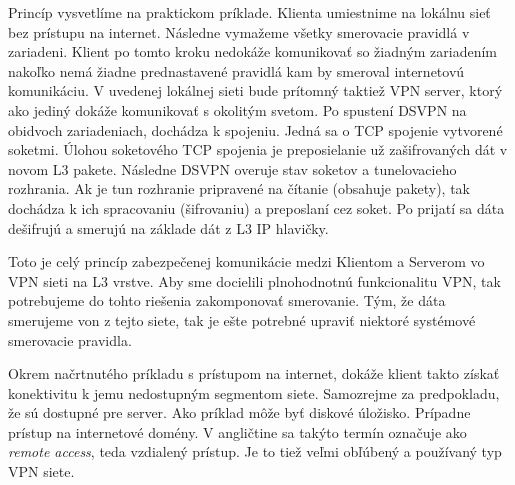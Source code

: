 Princíp vysvetlíme na praktickom príklade. Klienta umiestnime na lokálnu sieť bez prístupu na internet. Následne vymažeme všetky smerovacie pravidlá v zariadeni. Klient po tomto kroku nedokáže komunikovať so žiadným zariadením nakoľko nemá žiadne prednastavené pravidlá kam by smeroval internetovú komunikáciu. V uvedenej lokálnej sieti bude prítomný taktiež VPN server, ktorý ako jediný dokáže komunikovať s okolitým svetom. Po spustení DSVPN na obidvoch zariadeniach, dochádza k spojeniu. Jedná sa o TCP spojenie vytvorené soketmi. Úlohou soketového TCP spojenia je preposielanie už zašifrovaných dát v novom L3 pakete.  Následne DSVPN overuje stav soketov a tunelovacieho rozhrania. Ak je tun rozhranie pripravené na čítanie (obsahuje pakety), tak dochádza k ich spracovaniu (šifrovaniu) a preposlaní cez soket. Po prijatí sa dáta dešifrujú a smerujú na základe dát z L3 IP hlavičky. 

Toto je celý princíp zabezpečenej komunikácie medzi Klientom a Serverom vo VPN sieti na L3 vrstve. Aby sme docielili plnohodnotnú funkcionalitu VPN, tak potrebujeme do tohto riešenia zakomponovať smerovanie. Tým, že dáta smerujeme von z tejto siete, tak je ešte potrebné upraviť niektoré systémové smerovacie pravidla.      

Okrem načrtnutého príkladu s prístupom na internet, dokáže klient takto získať konektivitu k jemu nedostupným segmentom siete. Samozrejme za predpokladu, že sú dostupné pre server. Ako príklad môže byť diskové úložisko. Prípadne prístup na internetové domény. V angličtine sa takýto termín označuje ako \textit{remote access}, teda vzdialený prístup. Je to tiež veľmi obľúbený a používaný typ VPN siete. 

